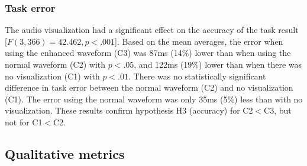 \subsubsection{Task error}
The audio visualization had a significant effect on the accuracy of the task result [$F(3,366)=42.462, p<.001$].
Based on the mean averages, the error when using the enhanced waveform (C3) was 87ms (14\%) lower than when using the
normal waveform (C2) with $p<.05$, and 122ms (19\%) lower than when there was no visualization (C1) with $p<.01$. There
was no statistically significant difference in task error between the normal waveform (C2) and no visualization (C1).
The error using the normal waveform was only 35ms (5\%) less than with no visualization.  These results confirm
hypothesis H3 (accuracy) for C2$<$C3, but not for C1$<$C2.







\subsection{Qualitative metrics}

